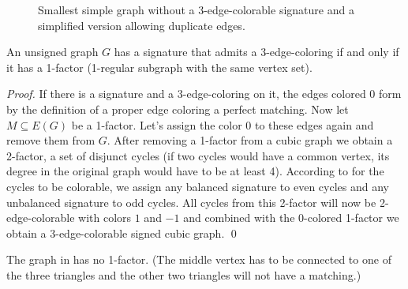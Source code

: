 \begin{figure}[h]
    \hspace{0.1\textwidth}

    \caption[Smallest simple graph without a 3-edge-colorable signature]{Smallest simple graph without a 3-edge-colorable signature and a simplified version allowing duplicate edges.}
\end{figure}

\begin{theorem}
    An unsigned graph $G$ has a signature that admits a 3-edge-coloring if and only if it has a 1-factor (1-regular subgraph with the same vertex set).
\end{theorem}

\textit{Proof.} If there is a signature and a 3-edge-coloring on it, the edges colored $0$ form by the definition of a proper edge coloring a perfect matching. Now let $M \subseteq E(G)$ be a 1-factor. Let's assign the color $0$ to these edges again and remove them from $G$. After removing a 1-factor from a cubic graph we obtain a 2-factor, a set of disjunct cycles (if two cycles would have a common vertex, its degree in the original graph would have to be at least 4). According to  for the cycles to be colorable, we assign any balanced signature to even cycles and any unbalanced signature to odd cycles. All cycles from this 2-factor will now be 2-edge-colorable with colors $1$ and $-1$ and combined with the $0$-colored 1-factor we obtain a 3-edge-colorable signed cubic graph. \qed

The graph in  has no 1-factor. (The middle vertex has to be connected to one of the three triangles and the other two triangles will not have a matching.)
